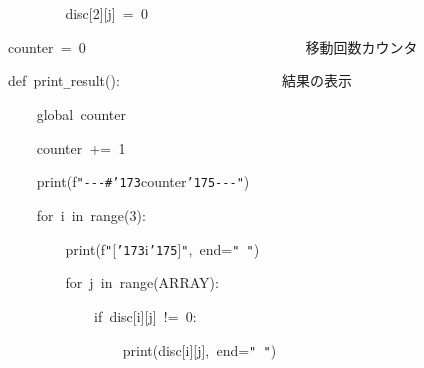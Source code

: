 \documentclass[a4paper,10pt]{article}
\def\mc{\relax}
\begin{document}
\noindent
\mbox{}{\tt\mc \ }{\tt\mc \ }{\tt\mc \ }{\tt\mc \ }{\tt\mc \ }{\tt\mc \ }{\tt\mc \ }{\tt\mc \ }disc[2][j]{\tt\mc \ }={\tt\mc \ }0

\noindent
\mbox{}\hfill

\noindent
\mbox{}counter{\tt\mc \ }={\tt\mc \ }0{\tt\mc \ }{\tt\mc \ }{\tt\mc \ }{\tt\mc \ }{\tt\mc \ }{\tt\mc \ }{\tt\mc \ }{\tt\mc \ }{\tt\mc \ }{\tt\mc \ }{\tt\mc \ }{\tt\mc \ }{\tt\mc \ }{\tt\mc \ }{\tt\mc \ }{\tt\mc \ }{\tt\mc \ }{\tt\mc \ }{\tt\mc \ }{\tt\mc \ }{\tt\mc \ }{\tt\mc \ }{\tt\mc \ }{\tt\mc \ }{\tt\mc \ }{\tt\mc \ }{\tt\mc \ }{\tt\mc \ }{\tt\mc \ }\rm\mc {\tt\#} \ 移動回数カウンタ \hfill 
\tt\mc 

\noindent
\mbox{}\hfill

\noindent
\mbox{}def{\tt\mc \ }print{\tt\_}result():{\tt\mc \ }{\tt\mc \ }{\tt\mc \ }{\tt\mc \ }{\tt\mc \ }{\tt\mc \ }{\tt\mc \ }{\tt\mc \ }{\tt\mc \ }{\tt\mc \ }{\tt\mc \ }{\tt\mc \ }{\tt\mc \ }{\tt\mc \ }{\tt\mc \ }{\tt\mc \ }{\tt\mc \ }{\tt\mc \ }{\tt\mc \ }{\tt\mc \ }{\tt\mc \ }\rm\mc {\tt\#} \ 結果の表示 \hfill 
\tt\mc 

\noindent
\mbox{}{\tt\mc \ }{\tt\mc \ }{\tt\mc \ }{\tt\mc \ }global{\tt\mc \ }counter

\noindent
\mbox{}{\tt\mc \ }{\tt\mc \ }{\tt\mc \ }{\tt\mc \ }counter{\tt\mc \ }+={\tt\mc \ }1

\noindent
\mbox{}{\tt\mc \ }{\tt\mc \ }{\tt\mc \ }{\tt\mc \ }print(f{\tt "}{\tt -}{\tt -}{\tt -}{\tt\#}{\tt\char'173}counter{\tt\char'175}{\tt -}{\tt -}{\tt -}{\tt "})

\noindent
\mbox{}{\tt\mc \ }{\tt\mc \ }{\tt\mc \ }{\tt\mc \ }for{\tt\mc \ }i{\tt\mc \ }in{\tt\mc \ }range(3):

\noindent
\mbox{}{\tt\mc \ }{\tt\mc \ }{\tt\mc \ }{\tt\mc \ }{\tt\mc \ }{\tt\mc \ }{\tt\mc \ }{\tt\mc \ }print(f{\tt "}[{\tt\char'173}i{\tt\char'175}]{\tt "},{\tt\mc \ }end={\tt "}{\tt\mc \ }{\tt "})

\noindent
\mbox{}{\tt\mc \ }{\tt\mc \ }{\tt\mc \ }{\tt\mc \ }{\tt\mc \ }{\tt\mc \ }{\tt\mc \ }{\tt\mc \ }for{\tt\mc \ }j{\tt\mc \ }in{\tt\mc \ }range(ARRAY):

\noindent
\mbox{}{\tt\mc \ }{\tt\mc \ }{\tt\mc \ }{\tt\mc \ }{\tt\mc \ }{\tt\mc \ }{\tt\mc \ }{\tt\mc \ }{\tt\mc \ }{\tt\mc \ }{\tt\mc \ }{\tt\mc \ }if{\tt\mc \ }disc[i][j]{\tt\mc \ }!={\tt\mc \ }0:

\noindent
\mbox{}{\tt\mc \ }{\tt\mc \ }{\tt\mc \ }{\tt\mc \ }{\tt\mc \ }{\tt\mc \ }{\tt\mc \ }{\tt\mc \ }{\tt\mc \ }{\tt\mc \ }{\tt\mc \ }{\tt\mc \ }{\tt\mc \ }{\tt\mc \ }{\tt\mc \ }{\tt\mc \ }print(disc[i][j],{\tt\mc \ }end={\tt "}{\tt\mc \ }{\tt "})
\end{document}

